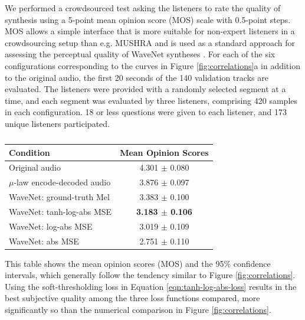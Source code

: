 We performed a crowdsourced test asking the listeners to rate the quality of synthesis using a 5-point mean opinion score (MOS) scale with 0.5-point steps.
MOS allows a simple interface that is more suitable for non-expert listeners in a crowdsourcing setup than e.g. MUSHRA \cite{itu2011mushra} and is used as a standard approach for assessing the perceptual quality of WaveNet syntheses \cite{oord2016wavenet,oord2017parallel}.
For each of the six configurations corresponding to the curves in Figure \ref{fig:correlations}a in addition to the original audio, the first 20 seconds of the 140 validation tracks are evaluated.
The listeners were provided with a randomly selected segment at a time, and each segment was evaluated by three listeners, comprising 420 samples in each configuration.
18 or less questions were given to each listener, and 173 unique listeners participated.

\begin{table}
	\centering
	\begin{tabular}{l|c} 
		Condition & Mean Opinion Scores \\ \hline
		Original audio & 4.301 $\pm$ 0.080 \\
		$\mu$-law encode-decoded audio & 3.876 $\pm$ 0.097 \\
		WaveNet: ground-truth Mel & 3.383 $\pm$ 0.100 \\
		\hline
		WaveNet: tanh-log-abs MSE & \textbf{3.183 $\pm$ 0.106} \\
		WaveNet: log-abs MSE & 3.019 $\pm$ 0.109 \\
		WaveNet: abs MSE & 2.751 $\pm$ 0.110 \\
	\end{tabular}
	\vspace{1em}
	\caption{}\label{tab:synthesis-quality}
\end{table}

This table shows the mean opinion scores (MOS) and the 95\% confidence intervals, which generally follow the tendency similar to Figure \ref{fig:correlations}.
Using the soft-thresholding loss in Equation \ref{eqn:tanh-log-abs-loss} results in the best subjective quality among the three loss functions compared, more significantly so than the numerical comparison in Figure \ref{fig:correlations}.

\setlength{\intextsep}{.1em}
\setlength{\columnsep}{1em}%

